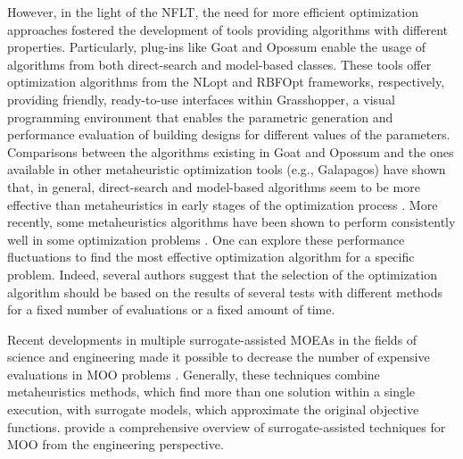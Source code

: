 	However, in the light of the \ac{NFLT}, the need for more efficient optimization approaches fostered the development of tools providing algorithms with different properties. Particularly, plug-ins like Goat and Opossum enable the usage of algorithms from both direct-search and model-based classes. These tools offer optimization algorithms from the NLopt and RBFOpt frameworks, respectively, providing friendly, ready-to-use interfaces within Grasshopper, a visual programming environment that enables the parametric generation and performance evaluation of building designs for different values of the parameters. Comparisons between the algorithms existing in Goat and Opossum and the ones available in other metaheuristic optimization tools (e.g., Galapagos) have shown that, in general, direct-search and model-based algorithms seem to be more effective than metaheuristics in early stages of the optimization process \cite{Wortmann2017,Wortmann2017GABESTCHOICE}. More recently, some metaheuristics algorithms have been shown to perform consistently well in some optimization problems \cite{Waibel2018}. One can explore these performance fluctuations to find the most effective optimization algorithm for a specific problem. Indeed, several authors suggest that the selection of the optimization algorithm should be based on the results of several tests with different methods for a fixed number of evaluations or a fixed amount of time\cite{Hamdy2016, Wortmann2016BBO}. 
	
	
	Recent developments in multiple surrogate-assisted \acp{MOEA} in the fields of science and engineering made it possible to decrease the number of expensive evaluations in \ac{MOO} problems \cite{Hussein2016,Zapotecas-Martinez2016}. Generally, these techniques combine metaheuristics methods, which find more than one solution within a single execution, with surrogate models, which approximate the original objective functions. \cite{Diaz-Manriquez2016} provide a comprehensive overview of surrogate-assisted techniques for \ac{MOO} from the engineering perspective. 
	
